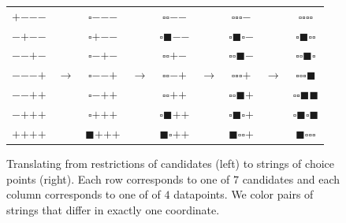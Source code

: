 \documentclass[openany, notitlepage, justified]{tufte-book}
\begin{document}
            \newcommand{\rR}[1]{{\color{moor}#1}}
            \newcommand{\gG}[1]{{\color{moog}#1}}
            \newcommand{\bB}[1]{{\color{moob}#1}}
            \newcommand{\E}{\texttt{$\square$}}
            \newcommand{\D}{\texttt{$\blacksquare$}}
            \newcommand{\A}{\texttt{$\bm{+}$}}
            \newcommand{\M}{\texttt{$\bm{-}$}}
            \begin{figure}[h]
                \centering
                \begin{tabular}{ccccccccc}
                       \A \M \M \M  &       &  \E \gG\M \M \M  &       &  \E \E \rR\M \M  &       &  \E \E \E \rR\M  &       &  \E \E \E \E  \\
                       \M \A \M \M  &       &  \E \gG\A \M \M  &       &  \E \D    \M \M  &       &  \E \D \E \bB\M  &       &  \E \D \E \E  \\
                       \M \M \A \M  &       &  \E    \M \A \M  &       &  \E \E \rR\A \M  &       &  \E \E \D \gG\M  &       &  \E \E \D \E  \\
                       \M \M \M \A  & $\to$ &  \E    \M \M \A  & $\to$ &  \E \E \gG\M \A  & $\to$ &  \E \E \E \rR\A  & $\to$ &  \E \E \E \D  \\
                       \M \M \A \A  &       &  \E \bB\M \A \A  &       &  \E \E \gG\A \A  &       &  \E \E \D \gG\A  &       &  \E \E \D \D  \\
                    \rR\M \A \A \A  &       &  \E \bB\A \A \A  &       &  \E \D    \A \A  &       &  \E \D \E \bB\A  &       &  \E \D \E \D  \\
                    \rR\A \A \A \A  &       &  \D    \A \A \A  &       &  \D \E    \A \A  &       &  \D \E \E    \A  &       &  \D \E \E \E
                \end{tabular}
                \caption{
                    Translating from restrictions of candidates (left) to
                    strings of choice points (right).  Each row corresponds to
                    one of $7$ candidates 
                    and each column corresponds to one of of $4$ datapoints.
                    We color pairs of strings that differ in exactly one coordinate.
                }
            \end{figure}
\end{document}
